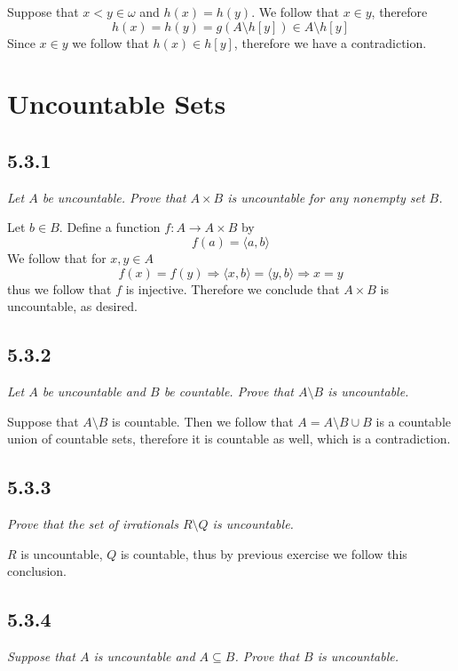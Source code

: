 \documentclass[11pt,oneside,titlepage]{book}
\DeclareMathOperator \ra {\Rightarrow}
\newcommand{\eangle}[1]{\langle #1 \rangle}
\begin{document}
Suppose that $x < y \in \omega$ and $h(x) = h(y)$. We follow that $x \in y$,
therefore
$$h(x) = h(y) = g(A \setminus h[y]) \in A \setminus h[y]$$
Since $x \in y$ we follow that $h(x) \in h[y]$, therefore we have a contradiction.


\section{Uncountable Sets}

\subsection*{5.3.1}

\textit{Let $A$ be uncountable. Prove that $A \times B$ is uncountable for any nonempty
  set $B$.}

Let $b \in B$. Define a function $f: A \to A \times B$ by
$$f(a) = \eangle{a, b}$$
We follow that for $x, y \in A$
$$f(x) = f(y) \ra \eangle{x, b}  = \eangle{y, b} \ra x = y$$
thus we follow that $f$ is injective. Therefore we conclude that $A \times B$ is
uncountable, as desired.

\subsection*{5.3.2}

\textit{Let $A$ be uncountable and $B$ be countable. Prove that $A \setminus B$ is
  uncountable.}

Suppose that $A \setminus B$ is countable. Then we follow that $A = A \setminus B \cup B$
is a countable union of countable sets, therefore it is countable as well, which
is a contradiction.

\subsection*{5.3.3}

\textit{Prove that the set of irrationals $R \setminus Q$ is uncountable.}

$R$ is uncountable, $Q$ is countable, thus by previous exercise we follow this
conclusion.

\subsection*{5.3.4}

\textit{Suppose that $A$ is uncountable and $A \subseteq B$. Prove that $B$ is
  uncountable.}
\end{document}
